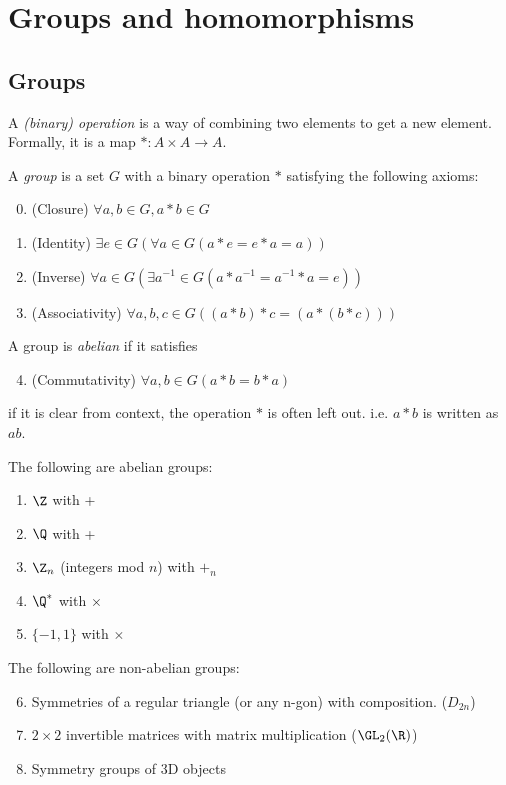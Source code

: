 \documentclass[a4paper]{article}
\begin{document}
  \section{Groups and homomorphisms}
  \subsection{Groups}
  \begin{defi}
    A \emph{(binary) operation} is a way of combining two elements to get a new element. Formally, it is a map $*: A \times A \rightarrow A$.
  \end{defi}
  \begin{defi}[Group]
    A \emph{group} is a set $G$ with a binary operation $*$ satisfying the following axioms:
    \begin{enumerate}[label=\arabic{*}.]
        \setcounter{enumi}{-1}
      \item (Closure) $\forall a, b\in G, a*b\in G$
      \item (Identity) $\exists e\in G(\forall a\in G (a*e = e*a = a))$
      \item (Inverse) $\forall a\in G(\exists a^{-1}\in G (a*a^{-1} = a^{-1}*a = e))$
      \item (Associativity) $\forall a, b, c\in G( (a*b)*c = (a*(b*c)))$
    \end{enumerate}
  \end{defi}
  \begin{defi}
    A group is \emph{abelian} if it satisfies
    \begin{enumerate}[label=\arabic{*}.]
        \setcounter{enumi}{3}
      \item (Commutativity) $\forall a, b\in G (a*b = b*a)$
    \end{enumerate}
  \end{defi}
  \note if it is clear from context, the operation $*$ is often left out. i.e. $a*b$ is written as $ab$.
  \begin{eg}
    The following are abelian groups:
    \begin{enumerate}
      \item $\Z$ with +
      \item $\Q$ with +
      \item $\Z_n$ (integers mod $n$) with $+_n$
      \item $\Q^*$ with $\times$
      \item $\{-1, 1\}$ with $\times$
    \end{enumerate}
    The following are non-abelian groups:
    \begin{enumerate}
        \setcounter{enumi}{5}
      \item Symmetries of a regular triangle (or any n-gon) with composition. ($D_{2n}$)
      \item $2\times 2$ invertible matrices with matrix multiplication ($\GL_2(\R)$)
      \item Symmetry groups of 3D objects
    \end{enumerate}
  \end{eg}
\end{document}
